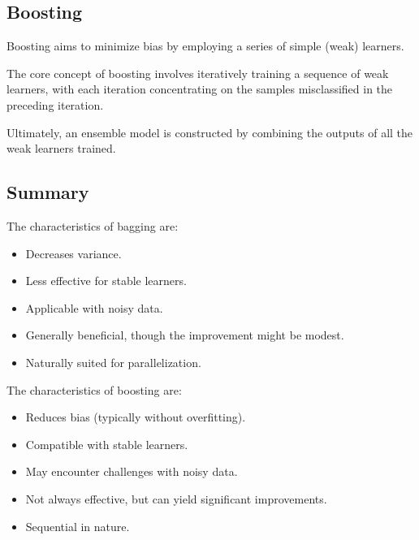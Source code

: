 \subsection{Boosting}
Boosting aims to minimize bias by employing a series of simple (weak) learners.

The core concept of boosting involves iteratively training a sequence of weak learners, with each iteration concentrating on the samples misclassified in the preceding iteration.

Ultimately, an ensemble model is constructed by combining the outputs of all the weak learners trained.

\subsection{Summary}
The characteristics of bagging are: 
\begin{itemize}
    \item Decreases variance.
    \item Less effective for stable learners.
    \item Applicable with noisy data.
    \item Generally beneficial, though the improvement might be modest.
    \item Naturally suited for parallelization.
\end{itemize}
The characteristics of boosting are: 
\begin{itemize}
    \item Reduces bias (typically without overfitting).
    \item Compatible with stable learners.
    \item May encounter challenges with noisy data.
    \item Not always effective, but can yield significant improvements.
    \item Sequential in nature.
\end{itemize}